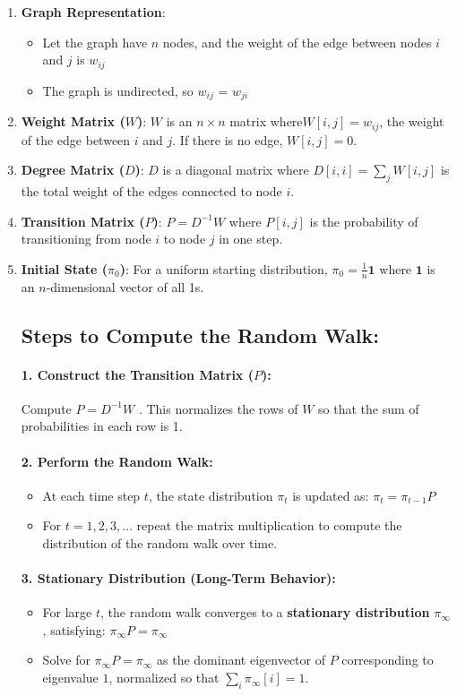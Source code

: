 \documentclass{article}
\begin{document}
\begin{enumerate}
    \item \textbf{Graph Representation}:
    \begin{itemize}
        \item Let the graph have $n$ nodes, and the weight of the edge between nodes $i$ and $j$ is $w_{ij}$ 
        \item The graph is undirected, so $w_{ij}$ = $w_{ji}$ 
    \end{itemize}
    \item \textbf{Weight Matrix ($W$)}:
$W$ is an $n\times n$  matrix where$ W[i,j]=w_{ij}$, the weight of the edge between $i$ and $j$. If there is no edge, $W[i,j]=0$.
    \item \textbf{Degree Matrix ($D$)}:
$D$ is a diagonal matrix where $D[i, i]$$ = \sum\limits_{j} W[i, j]$ is the total weight of the edges connected to node $i$.
    \item \textbf{Transition Matrix ($P$)}:   $P=D^{-1}W$ where $P[i,j]$ is the probability of transitioning from node $i$ to node $j$ in one step.
    \item \textbf{Initial State ($\pi_0$)}:
For a uniform starting distribution, $\pi_0=\frac{1}{n}\textbf{1}$ where $\textbf{1}$ is an $n$-dimensional vector of all 1s.
\subsection{Steps to Compute the Random Walk:}
\paragraph{1. \textbf{Construct the Transition Matrix ($P$)}:}
Compute $P=D^{-1}W$ . This normalizes the rows of $W$ so that the sum of probabilities in each row is 1.
\paragraph{2. \textbf{Perform the Random Walk}:}
\begin{itemize}
    \item At each time step $t$, the state distribution $\pi_t$ is updated as: $\pi_t=\pi_{t-1}P$ 
    \item For $t=1,2,3,\ldots$ repeat the matrix multiplication to compute the distribution of the random walk over time.
\end{itemize}
\paragraph{3. \textbf{Stationary Distribution (Long-Term Behavior)}:}
\begin{itemize}
    \item For large $t$, the random walk converges to a \textbf{stationary distribution} $\pi_\infty$, satisfying: $\pi_\infty P=\pi_\infty$
    \item Solve for  $\pi_{\infty}P=\pi_{\infty}$ as the dominant eigenvector of $P$ corresponding to eigenvalue $1$, normalized so that $\sum\limits_i^{}\pi_{\infty}[i] = 1$.
\end{itemize}
 
\end{enumerate}
\end{document}
